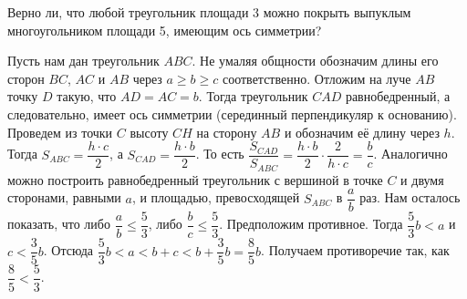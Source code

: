 Верно ли, что любой треугольник площади 3 можно покрыть выпуклым
многоугольником площади 5, имеющим ось симметрии?

\solution
Пусть нам дан треугольник $ABC$.
Не умаляя общности обозначим длины его сторон $BC$, $AC$ и $AB$ через
$a \geq b \geq c$ соответственно.
Отложим на луче $AB$ точку $D$ такую, что $AD = AC = b$.
Тогда треугольник $CAD$ равнобедренный, а следовательно, имеет ось симметрии
(серединный перпендикуляр к основанию).
Проведем из точки $C$ высоту $CH$ на сторону $AB$ и обозначим её длину через
$h$.
Тогда $S_{ABC} = \dfrac{h \cdot c}{2}$, а $S_{CAD} = \dfrac{h \cdot b}{2}$.
То есть
\(
    \dfrac{S_{CAD}}{S_{ABC}}
=
    \dfrac{h \cdot b}{2} \cdot \dfrac{2}{h \cdot c}
=
    \dfrac{b}{c}
\).
Аналогично можно построить равнобедренный треугольник с вершиной в точке $C$ и
двумя сторонами, равными $a$, и площадью, превосходящей $S_{ABC}$ в
$\dfrac{a}{b}$ раз.
Нам осталось показать, что либо $\dfrac{a}{b} \leq \dfrac{5}{3}$, либо
$\dfrac{b}{c} \leq \dfrac{5}{3}$.
Предположим противное.
Тогда $\dfrac{5}{3} b < a$ и $c < \dfrac{3}{5} b$.
Отсюда $\dfrac{5}{3} b < a < b + c < b + \dfrac{3}{5} b = \dfrac{8}{5} b$.
Получаем противоречие так, как $\dfrac{8}{5} < \dfrac{5}{3}$.

